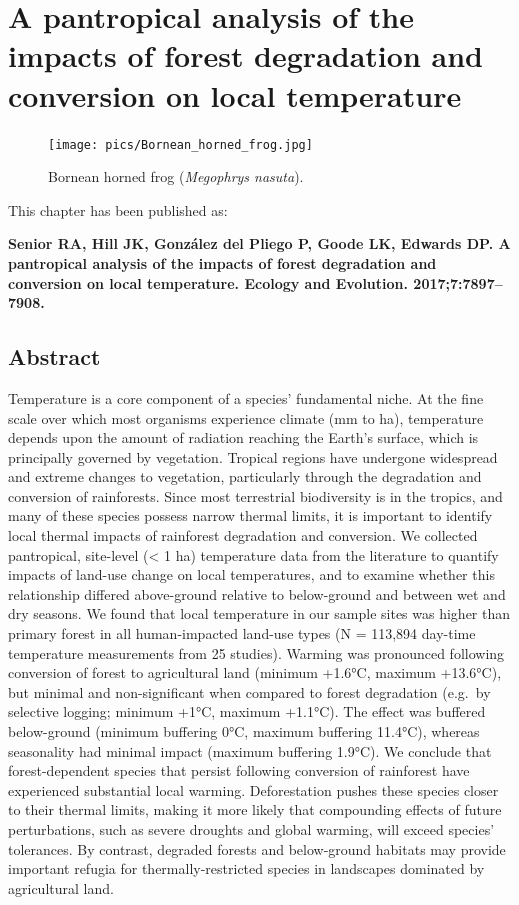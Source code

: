 \documentclass[12pt,a4paper,]{report}
\theoremstyle{definition}
\theoremstyle{definition}
\theoremstyle{definition}
\theoremstyle{remark}
\begin{document}
\chapter{A pantropical analysis of the impacts of forest degradation and
conversion on local
temperature}\label{a-pantropical-analysis-of-the-impacts-of-forest-degradation-and-conversion-on-local-temperature}

\begin{figure}[!htb]
\centering
\texttt{[image: pics/Bornean\_horned\_frog.jpg]}
\caption*{Bornean horned frog (\textit{Megophrys nasuta}).}
\end{figure}

This chapter has been published as:

\textbf{Senior RA, Hill JK, González del Pliego P, Goode LK, Edwards DP.
A pantropical analysis of the impacts of forest degradation and
conversion on local temperature. Ecology and Evolution.
2017;7:7897--7908.}

\pagebreak

\section{Abstract}\label{abstract-1}

Temperature is a core component of a species' fundamental niche. At the
fine scale over which most organisms experience climate (mm to ha),
temperature depends upon the amount of radiation reaching the Earth's
surface, which is principally governed by vegetation. Tropical regions
have undergone widespread and extreme changes to vegetation,
particularly through the degradation and conversion of rainforests.
Since most terrestrial biodiversity is in the tropics, and many of these
species possess narrow thermal limits, it is important to identify local
thermal impacts of rainforest degradation and conversion. We collected
pantropical, site-level (\textless{} 1 ha) temperature data from the
literature to quantify impacts of land-use change on local temperatures,
and to examine whether this relationship differed above-ground relative
to below-ground and between wet and dry seasons. We found that local
temperature in our sample sites was higher than primary forest in all
human-impacted land-use types (N = 113,894 day-time temperature
measurements from 25 studies). Warming was pronounced following
conversion of forest to agricultural land (minimum +1.6°C, maximum
+13.6°C), but minimal and non-significant when compared to forest
degradation (e.g.~by selective logging; minimum +1°C, maximum +1.1°C).
The effect was buffered below-ground (minimum buffering 0°C, maximum
buffering 11.4°C), whereas seasonality had minimal impact (maximum
buffering 1.9°C). We conclude that forest-dependent species that persist
following conversion of rainforest have experienced substantial local
warming. Deforestation pushes these species closer to their thermal
limits, making it more likely that compounding effects of future
perturbations, such as severe droughts and global warming, will exceed
species' tolerances. By contrast, degraded forests and below-ground
habitats may provide important refugia for thermally-restricted species
in landscapes dominated by agricultural land.
\end{document}
